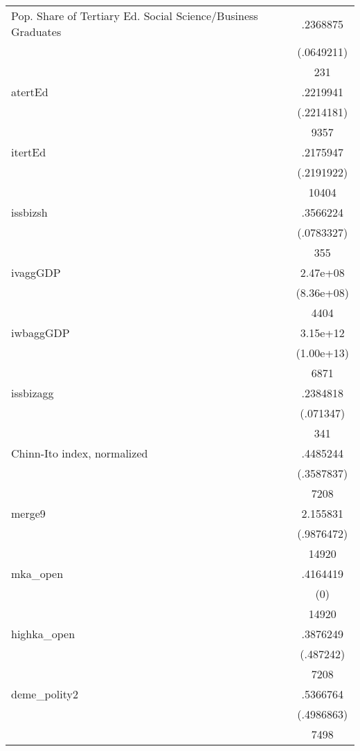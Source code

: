 {\begin{tabular}{l*{1}{c}}
Pop. Share of Tertiary Ed. Social Science/Business Graduates&    .2368875\\
                    &  (.0649211)\\
                    &         231\\
atertEd             &    .2219941\\
                    &  (.2214181)\\
                    &        9357\\
itertEd             &    .2175947\\
                    &  (.2191922)\\
                    &       10404\\
issbizsh            &    .3566224\\
                    &  (.0783327)\\
                    &         355\\
ivaggGDP            &    2.47e+08\\
                    &  (8.36e+08)\\
                    &        4404\\
iwbaggGDP           &    3.15e+12\\
                    &  (1.00e+13)\\
                    &        6871\\
issbizagg           &    .2384818\\
                    &   (.071347)\\
                    &         341\\
Chinn-Ito index, normalized&    .4485244\\
                    &  (.3587837)\\
                    &        7208\\
merge9              &    2.155831\\
                    &  (.9876472)\\
                    &       14920\\
mka\_open            &    .4164419\\
                    &         (0)\\
                    &       14920\\
highka\_open         &    .3876249\\
                    &   (.487242)\\
                    &        7208\\
deme\_polity2        &    .5366764\\
                    &  (.4986863)\\
                    &        7498\\
\hline\hline
\end{tabular}
}
